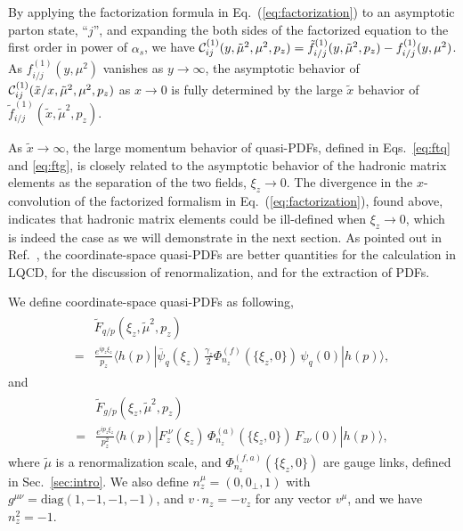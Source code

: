 By applying the factorization formula in Eq.~(\ref{eq:factorization}) to an asymptotic parton state, ``$j$'', and expanding the both sides of the factorized equation to the first order in power of $\alpha_s$, we have ${\cal C}^{(1)}_{ij}(y,\tilde{\mu}^2,\mu^2,p_z)=\tilde{f}^{(1)}_{i/j}(y,\tilde{\mu}^2,p_z) - f^{(1)}_{i/j}(y,\mu^2)$. As $f^{(1)}_{i/j}(y,\mu^2)$ vanishes as $y\to\infty$, the asymptotic behavior of ${\cal C}^{(1)}_{ij}(\tilde{x}/x,\tilde{\mu}^2,\mu^2,p_z)$ as $x\to 0$ is fully determined by the large $\tilde{x}$ behavior of $\tilde{f}^{(1)}_{i/j}(\tilde{x},\tilde{\mu}^2,p_z)$.

As $\tilde{x}\to\infty$, the large momentum behavior of quasi-PDFs, defined in Eqs.~\eqref{eq:ftq} and \eqref{eq:ftg}, is closely related to the asymptotic behavior of the hadronic matrix elements as the separation of the two fields, $\xi_z\to 0$.  The divergence in the $x$-convolution of the factorized formalism in Eq.~(\ref{eq:factorization}), found above, indicates that hadronic matrix elements could be ill-defined when $\xi_z\to 0$, which is indeed the case as we will demonstrate in the next section.  As pointed out in Ref.~\cite{Ma:2014jla}, the coordinate-space quasi-PDFs are better quantities for the calculation in LQCD, for the discussion of renormalization, and for the extraction of PDFs.

We define coordinate-space quasi-PDFs as following,
\begin{align}\label{eq:ftqx}
\begin{split}
&\tilde{F}_{q/p}(\xi_z,\tilde{\mu}^2,p_z)\\
=& \frac{e^{i p_z \xi_z}}{p_z} \langle h(p)| \overline{\psi}_q(\xi_z)\,\frac{\gamma_z}{2}
\Phi_{n_z}^{(f)}(\{\xi_z,0\})\, \psi_q(0) | h(p) \rangle,
\end{split}
\end{align}
and
\begin{align}\label{eq:ftgx}
\begin{split}
&\tilde{F}_{g/p}(\xi_z,\tilde{\mu}^2,p_z)\\
=&\frac{e^{i p_z \xi_z}}{p_z^2}\langle h(p)| F_{z}^{\ \nu}(\xi_z)\,
\Phi_{n_z}^{(a)}(\{\xi_z,0\})\, F_{z\nu}(0) | h(p) \rangle,
\end{split}
\end{align}
where $\tilde{\mu}$ is a renormalization scale, and $\Phi_{n_z}^{(f,a)}(\{\xi_z,0\})$ are gauge links, defined in Sec.~\ref{sec:intro}. We also define $n_z^\mu = (0,0_\perp, 1)$ with $g^{\mu\nu}=\text{diag}(1,-1,-1,-1)$, and $v\cdot n_z =- v_z$ for any vector $v^\mu$, and we have $n_z^2 = -1$.



